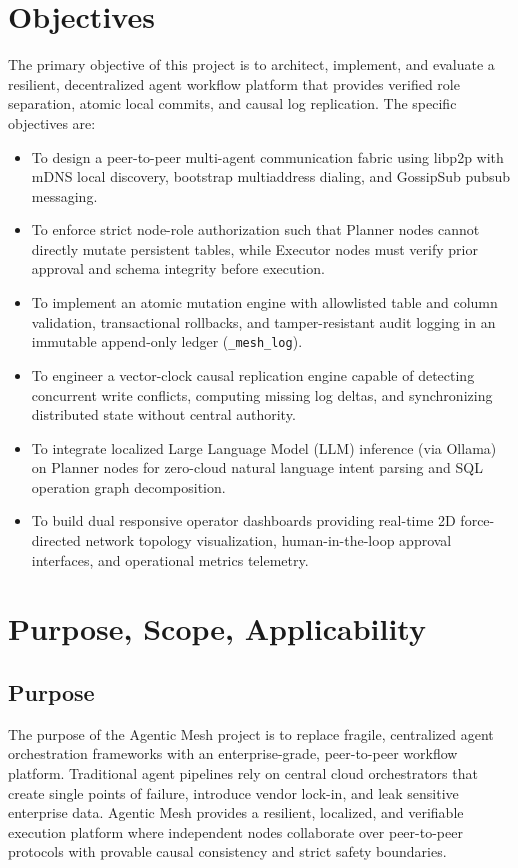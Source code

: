 \documentclass[12pt,a4paper]{report}
\begin{document}
\section{Objectives}
The primary objective of this project is to architect, implement, and evaluate a resilient, decentralized agent workflow platform that provides verified role separation, atomic local commits, and causal log replication. The specific objectives are:
\begin{itemize}[leftmargin=*,itemsep=2pt]
    \item To design a peer-to-peer multi-agent communication fabric using libp2p with mDNS local discovery, bootstrap multiaddress dialing, and GossipSub pubsub messaging.
    \item To enforce strict node-role authorization such that Planner nodes cannot directly mutate persistent tables, while Executor nodes must verify prior approval and schema integrity before execution.
    \item To implement an atomic mutation engine with allowlisted table and column validation, transactional rollbacks, and tamper-resistant audit logging in an immutable append-only ledger (\texttt{\_mesh\_log}).
    \item To engineer a vector-clock causal replication engine capable of detecting concurrent write conflicts, computing missing log deltas, and synchronizing distributed state without central authority.
    \item To integrate localized Large Language Model (LLM) inference (via Ollama) on Planner nodes for zero-cloud natural language intent parsing and SQL operation graph decomposition.
    \item To build dual responsive operator dashboards providing real-time 2D force-directed network topology visualization, human-in-the-loop approval interfaces, and operational metrics telemetry.
\end{itemize}

\section{Purpose, Scope, Applicability}

\subsection{Purpose}
The purpose of the Agentic Mesh project is to replace fragile, centralized agent orchestration frameworks with an enterprise-grade, peer-to-peer workflow platform. Traditional agent pipelines rely on central cloud orchestrators that create single points of failure, introduce vendor lock-in, and leak sensitive enterprise data. Agentic Mesh provides a resilient, localized, and verifiable execution platform where independent nodes collaborate over peer-to-peer protocols with provable causal consistency and strict safety boundaries.
\end{document}
